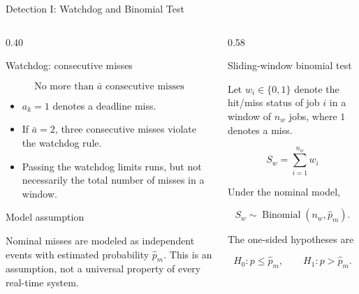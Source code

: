 \documentclass[9pt,aspectratio=169]{beamer}
\newcommand{\tightitemize}{
    \setlength{\itemsep}{1.5pt}
    \setlength{\parskip}{0pt}
    \setlength{\topsep}{2pt}
}
\begin{document}
\begin{frame}{Detection I: Watchdog and Binomial Test}

\footnotesize

\begin{columns}[T,onlytextwidth]

\begin{column}{0.40\textwidth}

\begin{block}{Watchdog: consecutive misses}

\[
\boxed{
\text{No more than }\bar a
\text{ consecutive misses}
}
\]

\begin{itemize}
\tightitemize
    \item $a_k=1$ denotes a deadline miss.
    \item If $\bar a=2$, three consecutive misses violate
    the watchdog rule.
    \item Passing the watchdog limits runs, but not necessarily
    the total number of misses in a window.
\end{itemize}

\end{block}

\begin{block}{Model assumption}

\scriptsize
Nominal misses are modeled as independent events with
estimated probability $\hat p_m$. This is an assumption,
not a universal property of every real-time system.
\end{block}

\end{column}


\begin{column}{0.58\textwidth}

\begin{block}{Sliding-window binomial test}

Let $w_i\in\{0,1\}$ denote the hit/miss status of job $i$
in a window of $n_w$ jobs, where $1$ denotes a miss.

\[
S_w=\sum_{i=1}^{n_w}w_i
\]

Under the nominal model,

\[
S_w\sim\operatorname{Binomial}(n_w,\hat p_m).
\]

The one-sided hypotheses are

\[
H_0:p\leq\hat p_m,
\qquad
H_1:p>\hat p_m.
\]


\end{block}
\end{column}
\end{columns}
\end{frame}
\end{document}
